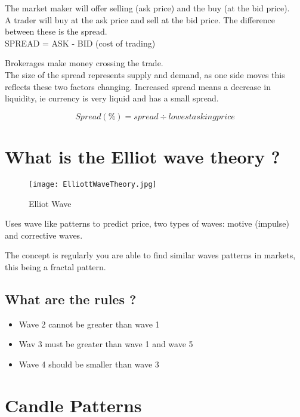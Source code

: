 \documentclass[11pt]{scrartcl} %
\begin{document}
The market maker will offer selling (ask price) and the buy (at the bid price).\\

A trader will buy at the ask price and sell at the bid price. The difference between these is the
spread.\\

SPREAD = ASK - BID (cost of trading)

Brokerages make money crossing the trade.\\

The size of the spread represents supply and demand, as one side moves this reflects these two factors
changing. Increased spread means a decrease in liquidity, ie currency is very liquid and has a small spread.

\[ Spread(\%) = spread \div lowest asking price \]

\section{What is the Elliot wave theory ?}

\begin{figure}[t] %
	\centering
	\texttt{[image: ElliottWaveTheory.jpg]} %
	\caption{Elliot Wave}
\end{figure}

Uses wave like patterns to predict price, two types of waves: motive (impulse) and corrective waves.

The concept is regularly you are able to find similar waves patterns in markets, this being
a fractal pattern.

\subsection{What are the rules ?}

\begin{itemize}
	\item Wave 2 cannot be greater than wave 1
	\item Wav 3 must be greater than wave 1 and wave 5
	\item Wave 4 should be smaller than wave 3
\end{itemize}

\section{Candle Patterns}
\end{document}
